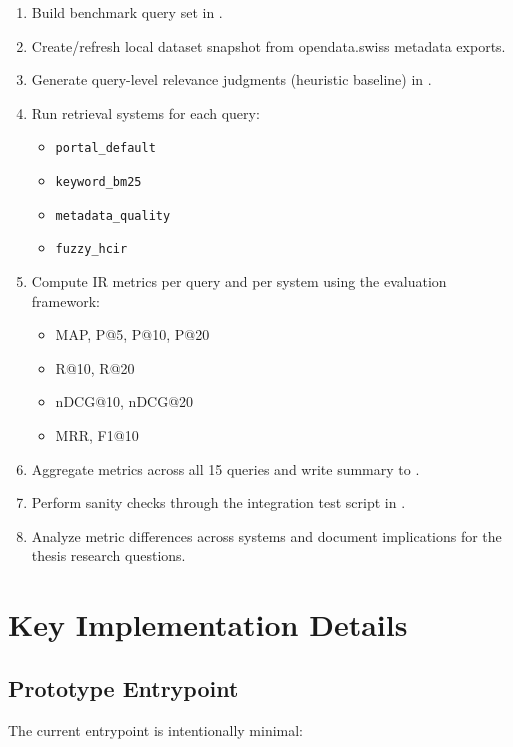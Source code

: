 \documentclass[11pt,a4paper]{article}
\begin{document}
\begin{enumerate}[leftmargin=1.5em]
  \item Build benchmark query set in \texttt{}.
  \item Create/refresh local dataset snapshot from opendata.swiss metadata exports.
  \item Generate query-level relevance judgments (heuristic baseline) in \texttt{}.
  \item Run retrieval systems for each query:
  \begin{itemize}[leftmargin=1.5em]
    \item \texttt{portal_default}
    \item \texttt{keyword_bm25}
    \item \texttt{metadata_quality}
    \item \texttt{fuzzy_hcir}
  \end{itemize}
  \item Compute IR metrics per query and per system using the evaluation framework:
  \begin{itemize}[leftmargin=1.5em]
    \item MAP, P@5, P@10, P@20
    \item R@10, R@20
    \item nDCG@10, nDCG@20
    \item MRR, F1@10
  \end{itemize}
  \item Aggregate metrics across all 15 queries and write summary to \texttt{}.
  \item Perform sanity checks through the integration test script in \texttt{}.
  \item Analyze metric differences across systems and document implications for the thesis research questions.
\end{enumerate}

\section{Key Implementation Details}

\subsection{Prototype Entrypoint}

The current entrypoint is intentionally minimal:
\end{document}
